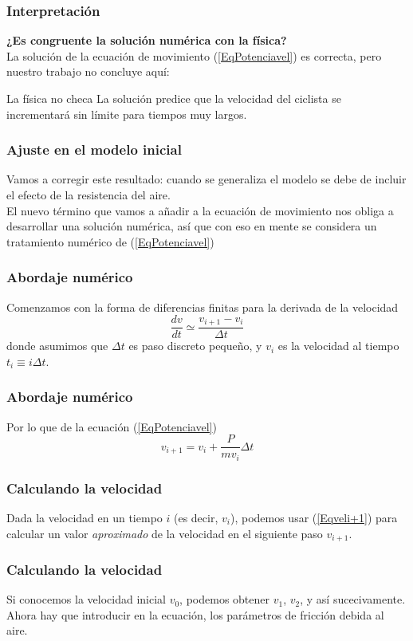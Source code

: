 \begin{frame}
\frametitle{Interpretación}
\textbf{¿Es congruente la solución numérica con la física?}
\\
\bigskip
\pause
La solución de la ecuación de movimiento (\ref{EqPotenciavel}) es correcta, pero nuestro trabajo no concluye aquí:
\pause
\begin{alertblock}{La física no checa}
La solución predice que la velocidad del ciclista se incrementará sin límite para tiempos muy largos.
\end{alertblock}
\end{frame}
\begin{frame}
\frametitle{Ajuste en el modelo inicial}
Vamos a corregir este resultado: cuando se generaliza el modelo se debe de incluir el efecto de la resistencia del aire.
\\
\bigskip
El nuevo término que vamos a añadir a la ecuación de movimiento nos obliga a desarrollar una solución numérica, así que con eso en mente se considera un tratamiento numérico de (\ref{EqPotenciavel})
\end{frame}
\begin{frame}
\frametitle{Abordaje numérico}
Comenzamos con la forma de diferencias finitas para la derivada de la velocidad
\begin{equation}\label{Eqderivada}
\dfrac{dv}{dt} \simeq \dfrac{v_{i+1}-v_{i}}{\Delta t}
\end{equation}
donde asumimos que $\Delta t$ es paso discreto pequeño, y $v_{i}$ es la velocidad al tiempo $t_{i} \equiv i \Delta t$.
\end{frame}
\begin{frame}
\frametitle{Abordaje numérico}
Por lo que de la ecuación (\ref{EqPotenciavel})
\begin{equation}\label{Eqveli+1}
v_{i+1} = v_{i} + \dfrac{P}{m v_{i}} \Delta t
\end{equation}
\end{frame}
\begin{frame}
\frametitle{Calculando la velocidad}
Dada la velocidad en un tiempo $i$ (es decir, $v_{i}$), podemos usar (\ref{Eqveli+1}) para calcular un valor \textit{aproximado} de la velocidad en el siguiente paso $v_{i+1}$.
\end{frame}
\begin{frame}
\frametitle{Calculando la velocidad}
Si conocemos la velocidad inicial $v_{0}$, podemos obtener $v_{1}$, $v_{2}$, y así sucecivamente.
\\
\bigskip
Ahora hay que introducir en la ecuación, los parámetros de fricción debida al aire.
\end{frame}
